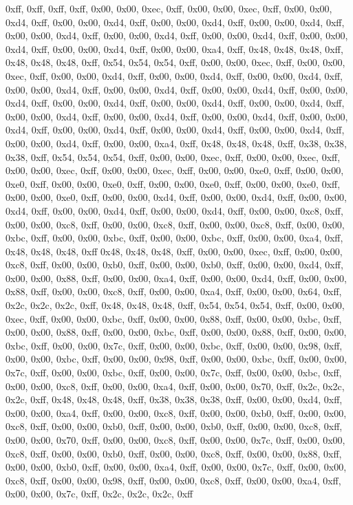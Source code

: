 0xff, 0xff, 0xff, 0xff, 0x00, 0x00, 0xec, 0xff, 0x00, 0x00, 0xec, 0xff, 0x00, 0x00, 0xd4, 0xff, 0x00, 0x00, 0xd4, 0xff, 0x00, 0x00, 0xd4, 0xff, 0x00, 0x00, 0xd4, 0xff, 0x00, 0x00, 0xd4, 0xff, 0x00, 0x00, 0xd4, 0xff, 0x00, 0x00, 0xd4, 0xff, 0x00, 0x00, 0xd4, 0xff, 0x00, 0x00, 0xd4, 0xff, 0x00, 0x00, 0xa4, 0xff, 0x48, 0x48, 0x48, 0xff, 0x48, 0x48, 0x48, 0xff, 0x54, 0x54, 0x54, 0xff, 0x00, 0x00, 0xec, 0xff, 0x00, 0x00, 0xec, 0xff, 0x00, 0x00, 0xd4, 0xff, 0x00, 0x00, 0xd4, 0xff, 0x00, 0x00, 0xd4, 0xff, 0x00, 0x00, 0xd4, 0xff, 0x00, 0x00, 0xd4, 0xff, 0x00, 0x00, 0xd4, 0xff, 0x00, 0x00, 0xd4, 0xff, 0x00, 0x00, 0xd4, 0xff, 0x00, 0x00, 0xd4, 0xff, 0x00, 0x00, 0xd4, 0xff, 0x00, 0x00, 0xd4, 0xff, 0x00, 0x00, 0xd4, 0xff, 0x00, 0x00, 0xd4, 0xff, 0x00, 0x00, 0xd4, 0xff, 0x00, 0x00, 0xd4, 0xff, 0x00, 0x00, 0xd4, 0xff, 0x00, 0x00, 0xd4, 0xff, 0x00, 0x00, 0xd4, 0xff, 0x00, 0x00, 0xa4, 0xff, 0x48, 0x48, 0x48, 0xff, 0x38, 0x38, 0x38, 0xff, 0x54, 0x54, 0x54, 0xff, 0x00, 0x00, 0xec, 0xff, 0x00, 0x00, 0xec, 0xff, 0x00, 0x00, 0xec, 0xff, 0x00, 0x00, 0xec, 0xff, 0x00, 0x00, 0xe0, 0xff, 0x00, 0x00, 0xe0, 0xff, 0x00, 0x00, 0xe0, 0xff, 0x00, 0x00, 0xe0, 0xff, 0x00, 0x00, 0xe0, 0xff, 0x00, 0x00, 0xe0, 0xff, 0x00, 0x00, 0xd4, 0xff, 0x00, 0x00, 0xd4, 0xff, 0x00, 0x00, 0xd4, 0xff, 0x00, 0x00, 0xd4, 0xff, 0x00, 0x00, 0xd4, 0xff, 0x00, 0x00, 0xc8, 0xff, 0x00, 0x00, 0xc8, 0xff, 0x00, 0x00, 0xc8, 0xff, 0x00, 0x00, 0xc8, 0xff, 0x00, 0x00, 0xbc, 0xff, 0x00, 0x00, 0xbc, 0xff, 0x00, 0x00, 0xbc, 0xff, 0x00, 0x00, 0xa4, 0xff, 0x48, 0x48, 0x48, 0xff
0x48, 0x48, 0x48, 0xff, 0x00, 0x00, 0xec, 0xff, 0x00, 0x00, 0xc8, 0xff, 0x00, 0x00, 0xb0, 0xff, 0x00, 0x00, 0xb0, 0xff, 0x00, 0x00, 0xd4, 0xff, 0x00, 0x00, 0x88, 0xff, 0x00, 0x00, 0xa4, 0xff, 0x00, 0x00, 0xd4, 0xff, 0x00, 0x00, 0x88, 0xff, 0x00, 0x00, 0xc8, 0xff, 0x00, 0x00, 0xa4, 0xff, 0x00, 0x00, 0x64, 0xff, 0x2c, 0x2c, 0x2c, 0xff, 0x48, 0x48, 0x48, 0xff, 0x54, 0x54, 0x54, 0xff, 0x00, 0x00, 0xec, 0xff, 0x00, 0x00, 0xbc, 0xff, 0x00, 0x00, 0x88, 0xff, 0x00, 0x00, 0xbc, 0xff, 0x00, 0x00, 0x88, 0xff, 0x00, 0x00, 0xbc, 0xff, 0x00, 0x00, 0x88, 0xff, 0x00, 0x00, 0xbc, 0xff, 0x00, 0x00, 0x7c, 0xff, 0x00, 0x00, 0xbc, 0xff, 0x00, 0x00, 0x98, 0xff, 0x00, 0x00, 0xbc, 0xff, 0x00, 0x00, 0x98, 0xff, 0x00, 0x00, 0xbc, 0xff, 0x00, 0x00, 0x7c, 0xff, 0x00, 0x00, 0xbc, 0xff, 0x00, 0x00, 0x7c, 0xff, 0x00, 0x00, 0xbc, 0xff, 0x00, 0x00, 0xc8, 0xff, 0x00, 0x00, 0xa4, 0xff, 0x00, 0x00, 0x70, 0xff, 0x2c, 0x2c, 0x2c, 0xff, 0x48, 0x48, 0x48, 0xff, 0x38, 0x38, 0x38, 0xff, 0x00, 0x00, 0xd4, 0xff, 0x00, 0x00, 0xa4, 0xff, 0x00, 0x00, 0xc8, 0xff, 0x00, 0x00, 0xb0, 0xff, 0x00, 0x00, 0xc8, 0xff, 0x00, 0x00, 0xb0, 0xff, 0x00, 0x00, 0xb0, 0xff, 0x00, 0x00, 0xc8, 0xff, 0x00, 0x00, 0x70, 0xff, 0x00, 0x00, 0xc8, 0xff, 0x00, 0x00, 0x7c, 0xff, 0x00, 0x00, 0xc8, 0xff, 0x00, 0x00, 0xb0, 0xff, 0x00, 0x00, 0xc8, 0xff, 0x00, 0x00, 0x88, 0xff, 0x00, 0x00, 0xb0, 0xff, 0x00, 0x00, 0xa4, 0xff, 0x00, 0x00, 0x7c, 0xff, 0x00, 0x00, 0xc8, 0xff, 0x00, 0x00, 0x98, 0xff, 0x00, 0x00, 0xc8, 0xff, 0x00, 0x00, 0xa4, 0xff, 0x00, 0x00, 0x7c, 0xff, 0x2c, 0x2c, 0x2c, 0xff
